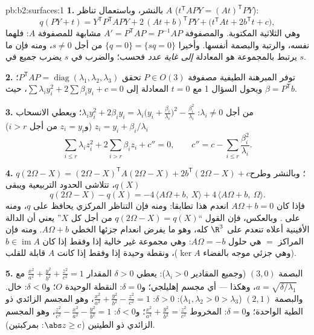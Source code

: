 \begin{solution}{pb:b2:surfaces:1}
\textbf{1.} بالنشر، وباستعمال تناظر $A$ ($t^{\mathsf T}\!APY = (At)^{\mathsf T}PY$):
\[
q(PY + t) = Y^{\mathsf T}P^{\mathsf T}\!APY +
2\,(At + b)^{\mathsf T}PY + \bigl(t^{\mathsf T}\!At +
2b^{\mathsf T}t + c\bigr),
\]
وهي الثلاثية المكتوبة. والمصفوفة $A' = P^{\mathsf T}\!AP =
P^{-1}AP$ مشابهة للمصفوفة $A$: فلهما
 نفسه،  والرتبة والبصمة أنفسها. وأخيرا
$\{q = 0\} = \{sq = 0\}$ من أجل $s \neq 0$، ومنه فإن ما يرتبط بالمجموعة هو المعادلة
\emph{إلى غاية عدد} فحسب؛ والضرب في $s$ يضرب جميع 
في $s$.

\textbf{2.} توفر المبرهنة الطيفية مصفوفة $P \in O(3)$ تحقق $P^{\mathsf T}\!AP = \operatorname{diag}(\lambda_1, \lambda_2,
\lambda_3)$؛
ويحول السؤال 1 مع $t = 0$ المعادلة إلى $\sum\lambda_iy_i^2 + 2\sum\beta_iy_i + c = 0$، حيث $\beta =
P^{\mathsf T}b$.

\textbf{3.} من أجل $\lambda_i \neq 0$: $\lambda_iy_i^2 +
2\beta_iy_i = \lambda_i\bigl(y_i +
\frac{\beta_i}{\lambda_i}\bigr)^2 -
\frac{\beta_i^2}{\lambda_i}$؛ ويعطي الانسحاب $z_i = y_i +
\beta_i/\lambda_i$ (و$z_i = y_i$
من أجل $i > r$)
\[
\sum_{i \leq r}\lambda_iz_i^2 + 2\sum_{i > r}\beta_iz_i +
c'' = 0, \qquad
c'' = c - \sum_{i\leq r}\frac{\beta_i^2}{\lambda_i}.
\]

\textbf{4.} $q(2\Omega - X) = (2\Omega - X)^{\mathsf T}
A(2\Omega - X) + 2b^{\mathsf T}(2\Omega - X) + c$؛ وبالنشر وطرح $q(X)$، تتلاشى الحدود التربيعية
ويبقى
\[
q(2\Omega - X) - q(X) = -4\,\langle A\Omega + b,\ X\rangle +
4\,\langle A\Omega + b,\ \Omega\rangle .
\]
فإذا كان $A\Omega + b = 0$ انعدم هذا تطابقا: ومنه فإن التناظر المركزي يحافظ على
$q$، ومنه على . وبالعكس، فإن القول
``$q(2\Omega - X) = q(X)$ من أجل كل $X$'' يعني أن الدالة الأفينية أعلاه تنعدم على
$\R^3$ كله، وهو ما يفرض انعدام جزئها الخطي $A\Omega + b$. ومنه فإن المراكز
$=$ هي حلول $A\Omega = -b$: وهي مجموعة غير خالية إذا وفقط إذا كان $b \in \operatorname{im}A$
(وهي  جزئي موجه بالفضاء $\ker A$)، ونقطة وحيدة إذا وفقط إذا
كانت $A$ قابلة للقلب.

\textbf{5.} البصمة $(3,0)$ (وجميع المقادير $\lambda_i > 0$): يعطي $\delta >
0$
المقدار $\frac{x^2}{a^2} + \frac{y^2}{b^2} + \frac{z^2}{c^2}
= 1$ مع $a = \sqrt{\delta/\lambda_1}$، وهكذا --- أي مجسم إهليلجي؛ و$\delta = 0$:
النقطة الوحيدة $O$؛ و$\delta < 0$: خال. والبصمة $(2,1)$ ($\lambda_1, \lambda_2 > 0 >
\lambda_3$):
$\delta > 0$: $\frac{x^2}{a^2} + \frac{y^2}{b^2}
- \frac{z^2}{c^2} = 1$، وهو المجسم الزائدي ذو الطية الواحدة؛ و$\delta =
0$:
المخروط $\frac{x^2}{a^2} + \frac{y^2}{b^2} =
\frac{z^2}{c^2}$؛ و$\delta < 0$: $\frac{z^2}{c^2} -
\frac{x^2}{a^2} - \frac{y^2}{b^2} = 1$، وهو المجسم الزائدي ذو الطيتين
($\abs z \geq c$: بمركبتين).


\end{solution}
